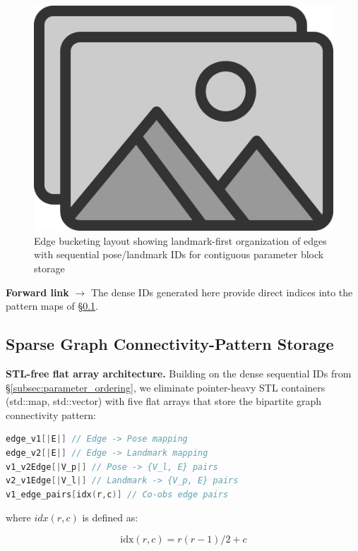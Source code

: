 \begin{figure}[t]
  \centering
  \includegraphics[width=0.85\linewidth]{figs/placeholder}
  \caption{Edge bucketing layout showing landmark-first organization of edges with sequential 
  pose/landmark IDs for contiguous parameter block storage}
  \label{fig:dense_layout}
\end{figure}

\textbf{Forward link} $\rightarrow$ The dense IDs generated here provide direct indices into the pattern maps of
 \S\ref{subsec:connectivity_storage}.

\subsection{Sparse Graph Connectivity-Pattern Storage}
\label{subsec:connectivity_storage}

\textbf{STL-free flat array architecture.} Building on the dense sequential IDs from \S\ref{subsec:parameter_ordering}, 
we eliminate pointer-heavy STL containers (std::map, std::vector) with five flat arrays that store the 
bipartite graph connectivity pattern:

\begin{lstlisting}[language=C++, basicstyle=\ttfamily\small]
edge_v1[|E|] // Edge -> Pose mapping
edge_v2[|E|] // Edge -> Landmark mapping  
v1_v2Edge[|V_p|] // Pose -> {V_l, E} pairs
v2_v1Edge[|V_l|] // Landmark -> {V_p, E} pairs
v1_edge_pairs[idx(r,c)] // Co-obs edge pairs
\end{lstlisting}

where $idx(r,c)$ is defined as:

\begin{equation}
  \text{idx}(r,c) = r(r-1)/2 + c
  \label{eq:closed_form}
\end{equation}

